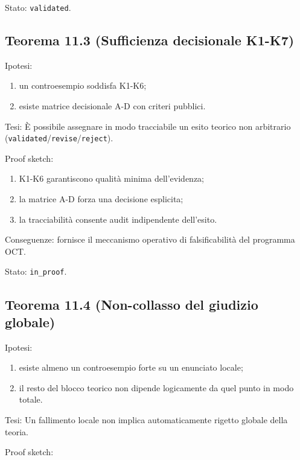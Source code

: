 Stato: \texttt{validated}.

\subsection{Teorema 11.3 (Sufficienza decisionale K1-K7)}

Ipotesi:

\begin{enumerate}
\def\labelenumi{\arabic{enumi}.}
\tightlist
\item
  un controesempio soddisfa K1-K6;
\item
  esiste matrice decisionale A-D con criteri pubblici.
\end{enumerate}

Tesi:
È possibile assegnare in modo tracciabile un esito teorico non arbitrario (\texttt{validated}/\texttt{revise}/\texttt{reject}).

Proof sketch:

\begin{enumerate}
\def\labelenumi{\arabic{enumi}.}
\tightlist
\item
  K1-K6 garantiscono qualità minima dell'evidenza;
\item
  la matrice A-D forza una decisione esplicita;
\item
  la tracciabilità consente audit indipendente dell'esito.
\end{enumerate}

Conseguenze:
fornisce il meccanismo operativo di falsificabilità del programma OCT.

Stato: \texttt{in\_proof}.

\subsection{Teorema 11.4 (Non-collasso del giudizio globale)}

Ipotesi:

\begin{enumerate}
\def\labelenumi{\arabic{enumi}.}
\tightlist
\item
  esiste almeno un controesempio forte su un enunciato locale;
\item
  il resto del blocco teorico non dipende logicamente da quel punto in modo totale.
\end{enumerate}

Tesi:
Un fallimento locale non implica automaticamente rigetto globale della teoria.

Proof sketch:

